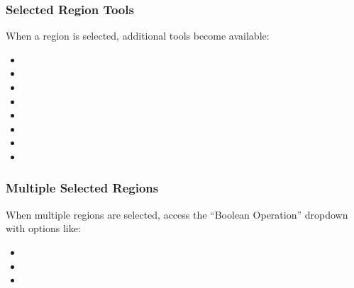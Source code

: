 \documentclass[letterpaper,10pt,english,openany,oneside]{sphinxmanual}
\begin{document}
\subsubsection{Selected Region Tools}
\label{\detokenize{docs/starting/regions:selected-region-tools}}
\sphinxAtStartPar
When a region is selected, additional tools become available:
\begin{itemize}
\item {} 
\sphinxAtStartPar
{}

\item {} 
\sphinxAtStartPar
{}

\item {} 
\sphinxAtStartPar
{}

\item {} 
\sphinxAtStartPar
{}

\item {} 
\sphinxAtStartPar
{}

\item {} 
\sphinxAtStartPar
{}

\item {} 
\sphinxAtStartPar
{}

\item {} 
\sphinxAtStartPar
{}

\end{itemize}


\subsubsection{Multiple Selected Regions}
\label{\detokenize{docs/starting/regions:multiple-selected-regions}}
\sphinxAtStartPar
When multiple regions are selected, access the “Boolean Operation” dropdown with options like:
\begin{itemize}
\item {} 
\sphinxAtStartPar
{}

\item {} 
\sphinxAtStartPar
{}

\item {} 
\sphinxAtStartPar
{}

\end{itemize}
\end{document}
